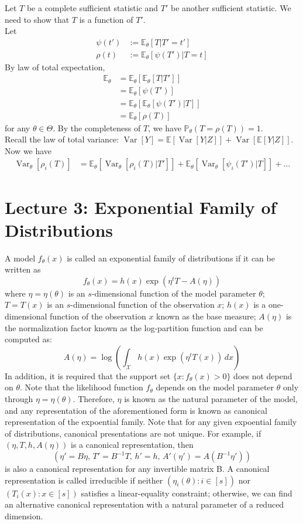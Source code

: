\documentclass[11pt, oneside]{book}
\DeclareMathOperator{\Var}{Var}
\newcommand{\E}{\mathbb{E}}
\theoremstyle{definition}
\begin{document}
Let $T$ be a complete sufficient statistic and $T'$ be another sufficient statistic. We need to show that $T$ is a function of $T'$. \\

Let 
\begin{align*}
  \psi(t') & := \mathbb{E}_\theta [T | T' = t'] \\
  \rho(t) & := \mathbb{E}_\theta[\psi(T') | T=t]
\end{align*}
By law of total expectation,
\begin{align*}
  \mathbb{E}_\theta &= \mathbb{E}_\theta[\mathbb{E}_\theta[T|T']] \\
                    &= \mathbb{E}_\theta[\psi(T')] \\
                    &= \mathbb{E}_\theta[\mathbb{E}_\theta[\psi(T')|T]] \\
                    &= \mathbb{E}_\theta[\rho(T)]
\end{align*}
for any $\theta \in \Theta$. By the completeness of $T$, we have $\mathbb{P}_\theta(T=\rho(T)) = 1$. \\

\noindent Recall the law of total variance: $\Var[Y] = \E[\Var[Y|Z]]+\Var[\E[Y|Z]]$. Now we have 
\begin{align*}
  \Var_\theta[\rho_i(T)] &= \E_\theta[\Var_\theta[\rho_i(T)|T']] + \E_\theta[\Var_\theta[\psi_i(T')|T]] + ...
\end{align*}

\section{Lecture 3: Exponential Family of Distributions}
A model $f_\theta(x)$ is called an exponential family of distributions if it can be written as 
\[
  f_\theta(x) = h(x) \exp (\eta^t T - A(\eta))
\]
where $\eta = \eta(\theta)$ is an $s$-dimensional function of the model parameter $\theta$; $T=T(x)$ is an $s$-dimensional function of the observation $x$; $h(x)$ is a one-dimensional function of the observation $x$ known as the base measure; $A(\eta)$ is the normalization factor known as the log-partition function and can be computed as:
\[ 
  A(\eta) = \log \left( \int_{\mathcal{X}} h(x) \exp (\eta^t T(x)) \, dx \right)
\]
In addition, it is required that the support set $\{x : f_\theta(x) > 0 \}$ does not depend on $\theta$. Note that the likelihood function $f_\theta$ depends on the model parameter $\theta$ only through $\eta = \eta(\theta)$. Therefore, $\eta$ is known as the natural parameter of the model, and any representation of the aforementioned form is known as canonical representation of the expoential family. Note that for any given expoential family of distributions, canonical presentations are not unique. For example, if $(\eta, T, h, A(\eta))$ is a canonical representation, then 
\[
  (\eta' = B\eta, \, T' = B^{-1}T, \, h'=h, \, A'(\eta') = A(B^{-1} \eta'))
\]
is also a canonical representation for any invertible matrix B. A canonical representation is called irreducible if neither $(\eta_i(\theta) : i \in [s])$ nor $(T_i(x) : x \in [s])$ satisfies a linear-equality constraint; otherwise, we can find an alternative canonical representation with a natural parameter of a reduced dimension.
\end{document}
